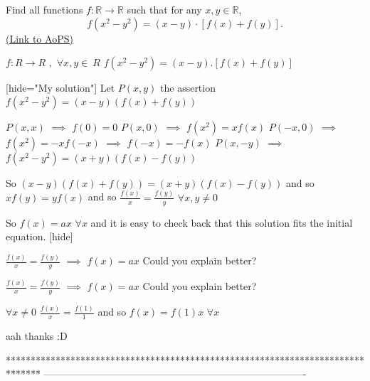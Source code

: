 \begin{problem}
	Find all functions $ f : \mathbb{R}\to\mathbb{R}$ such that for any $ x,y\in \mathbb R$,
\[ f(x^2 - y^2) = (x - y)\cdot [f(x) + f(y)].\]
	\flushright \href{https://artofproblemsolving.com/community/c6h285970}{(Link to AoPS)}
\end{problem}



\begin{solution}
	\begin{tcolorbox}$ f: R\rightarrow R$ $ ,$     $ \forall x,y\in\ R$            $ f(x^2 - y^2) = (x - y).[f(x) + f(y)]$\end{tcolorbox}

[hide="My solution"]
Let $ P(x,y)$ the assertion $ f(x^2-y^2)=(x-y)(f(x)+f(y))$

$ P(x,x)$ $ \implies$ $ f(0)=0$
$ P(x,0)$ $ \implies$ $ f(x^2)=xf(x)$
$ P(-x,0)$ $ \implies$ $ f(x^2)=-xf(-x)$ $ \implies$ $ f(-x)=-f(x)$
$ P(x,-y)$ $ \implies$ $ f(x^2-y^2)=(x+y)(f(x)-f(y))$

So $ (x-y)(f(x)+f(y))=(x+y)(f(x)-f(y))$ and so $ xf(y)=yf(x)$ and so $ \frac{f(x)}{x}=\frac{f(y)}{y}$ $ \forall x,y\neq 0$

So $ f(x)=ax$ $ \forall x$ and it is easy to check back that this solution fits the initial equation.
[\/hide]
\end{solution}



\begin{solution}
	$ \frac{f(x)}{x}=\frac{f(y)}{y}$ $ \implies$  $ f(x) = ax$ Could you explain better?
\end{solution}



\begin{solution}
	\begin{tcolorbox}$ \frac {f(x)}{x} = \frac {f(y)}{y}$ $ \implies$  $ f(x) = ax$ Could you explain better?\end{tcolorbox}

$ \forall x\neq 0$ $ \frac{f(x)}{x}=\frac{f(1)}{1}$ and so $ f(x)=f(1)x$ $ \forall x$
\end{solution}



\begin{solution}
	aah thanks   :D
\end{solution}
*******************************************************************************
-------------------------------------------------------------------------------

